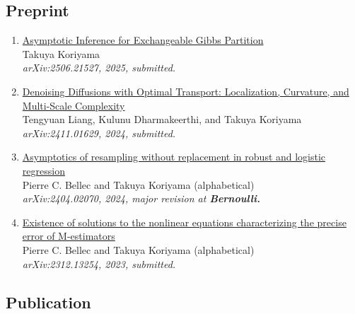 \documentclass[10pt]{amsart}
\begin{document}
\subsection*{Preprint}
\begin{enumerate}
\item \href{https://arxiv.org/abs/2506.21527}{Asymptotic Inference for Exchangeable Gibbs Partition}\\
Takuya Koriyama\\
\textit{arXiv:2506.21527, 2025, submitted.}

\item \href{https://arxiv.org/abs/2411.01629}{Denoising Diffusions with Optimal Transport: Localization, Curvature, and Multi-Scale Complexity}\\
Tengyuan Liang, Kulunu Dharmakeerthi, and Takuya Koriyama \\
\textit{arXiv:2411.01629, 2024, submitted.}

\item \href{https://arxiv.org/abs/2404.02070}{Asymptotics of resampling without replacement in robust and logistic regression}\\
Pierre C. Bellec and Takuya Koriyama (alphabetical)\\
\textit{arXiv:2404.02070, 2024, major revision at \textbf{Bernoulli.}}

\item \href{https://arxiv.org/abs/2312.13254}{Existence of solutions to the nonlinear equations characterizing the precise error of M-estimators}\\
Pierre C. Bellec and Takuya Koriyama (alphabetical)\\
\textit{arXiv:2312.13254, 2023, submitted.}
\end{enumerate}

\subsection*{Publication}
\end{document}
